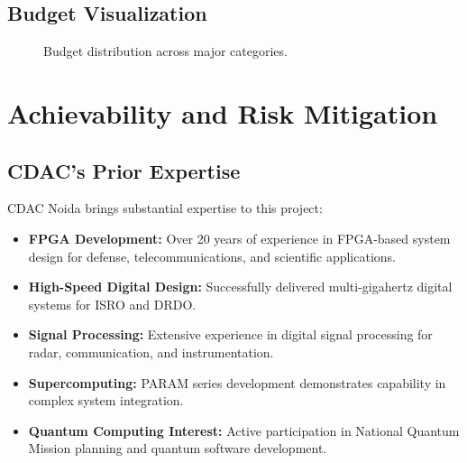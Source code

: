\documentclass[12pt,a4paper]{article}
\theoremstyle{definition}
\begin{document}
\subsection{Budget Visualization}

\begin{figure}[htbp]
\centering
{}
\caption{Budget distribution across major categories.}
\label{fig:budget_pie}
\end{figure}

\section{Achievability and Risk Mitigation}
\label{sec:risk}

\subsection{CDAC's Prior Expertise}

CDAC Noida brings substantial expertise to this project:

\begin{itemize}
    \item \textbf{FPGA Development:} Over 20 years of experience in FPGA-based system design for defense, telecommunications, and scientific applications.
    
    \item \textbf{High-Speed Digital Design:} Successfully delivered multi-gigahertz digital systems for ISRO and DRDO.
    
    \item \textbf{Signal Processing:} Extensive experience in digital signal processing for radar, communication, and instrumentation.
    
    \item \textbf{Supercomputing:} PARAM series development demonstrates capability in complex system integration.
    
    \item \textbf{Quantum Computing Interest:} Active participation in National Quantum Mission planning and quantum software development.
\end{itemize}
\end{document}

